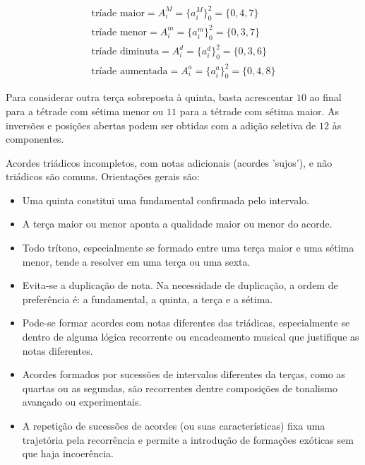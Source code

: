 \begin{equation}\label{triades}
\begin{split}
\text{tríade maior} = A_i^M= \{a_i^M\}_0^2=\{0,4,7\} \\ 
\text{tríade menor} = A_i^m = \{a_i^m\}_0^2=\{0,3,7\} \\
\text{tríade diminuta} = A_i^d = \{a_i^d\}_0^2=\{0,3,6\} \\
\text{tríade aumentada} = A_i^a = \{a_i^a\}_0^2=\{0,4,8\}
\end{split}
\end{equation}

Para considerar outra terça sobreposta à quinta, basta acrescentar $10$ ao final para a tétrade
com sétima menor ou $11$ para a tétrade com sétima maior. As inversões e posições abertas
podem ser obtidas com a adição seletiva de $12$ às componentes.

Acordes triádicos incompletos, com notas adicionais (acordes 'sujos'), e não triádicos são comuns.
Orientações gerais são:
\begin{itemize}
    \item Uma quinta constitui uma fundamental confirmada pelo intervalo.
    \item A terça maior ou menor aponta a qualidade maior ou menor do acorde.
    \item Todo trítono, especialmente se formado entre uma terça maior e uma sétima menor, tende a resolver em uma terça ou uma sexta.
    \item Evita-se a duplicação de nota. Na necessidade de duplicação, a ordem de preferência é: a fundamental, a quinta, a terça e a sétima.
    \item Pode-se formar acordes com notas diferentes das triádicas, especialmente se dentro de alguma lógica recorrente ou encadeamento musical que justifique as notas diferentes.
    \item Acordes formados por sucessões de intervalos diferentes da terças, como as quartas ou as segundas, são recorrentes dentre composições de tonalismo avançado ou experimentais.
    \item A repetição de sucessões de acordes (ou suas características) fixa uma trajetória pela recorrência e permite a introdução de formações exóticas sem que haja incoerência.
\end{itemize}


